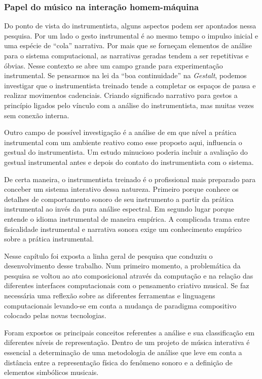 \documentclass{ppgmus}
\begin{document}
\subsubsection{Papel do músico na interação homem-máquina}


Do ponto de vista do instrumentista, alguns aspectos podem ser apontados nessa pesquisa.
Por um lado o gesto instrumental é ao mesmo tempo o impulso inicial e uma espécie
de ``cola'' narrativa. Por mais que se forneçam elementos de análise para o sistema
computacional, as narrativas geradas tendem a ser repetitivas e óbvias. Nesse contexto
se abre um campo grande para experimentação instrumental. Se pensarmos na lei da ``boa continuidade''
na \textit{Gestalt}, podemos investigar que o instrumentista treinado tende a completar
os espaços de pausa e realizar movimentos cadenciais. Criando significado narrativo
para gestos a princípio ligados pelo vínculo com a análise do instrumentista, mas muitas
vezes sem conexão interna.

Outro campo de possível investigação é a análise de em que
nível a prática instrumental com um ambiente reativo como
esse proposto aqui, influencia o gestual do instrumentista.
Um estudo minucioso poderia incluir a avaliação do gestual
instrumental antes e depois do contato do instrumentista com 
o sistema.

De certa maneira, o instrumentista treinado é o profissional
mais preparado para conceber um sistema interativo dessa natureza.
Primeiro porque conhece os detalhes de comportamento sonoro de seu
instrumento a partir da prática instrumental ao invés da pura análise
espectral. Em segundo lugar porque entende o idioma instrumental
de maneira empírica. A complicada trama entre fisicalidade instrumental
e narrativa sonora exige um conhecimento empírico sobre a prática
instrumental.



Nesse capítulo foi exposta a linha geral de pesquisa que conduziu
o desenvolvimento desse trabalho.
Num primeiro momento, a problemática da pesquisa se voltou ao ato composicional
através da computação e na relação das diferentes interfaces computacionais
com o pensamento criativo musical. Se faz necessária uma reflexão sobre
as diferentes ferramentas e linguagens computacionais levando-se em conta
a mudança de paradigma compositivo colocado pelas novas tecnologias.

Foram expostos os principais conceitos referentes a análise e sua
classificação em diferentes níveis de representação.
Dentro de um projeto de música interativa é essencial a determinação de uma
metodologia de análise que leve em conta a distância entre a representação
física do fenômeno sonoro e a definição de elementos simbólicos musicais.
\end{document}
